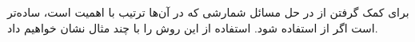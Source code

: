 \p
برای کمک گرفتن از 
 در حل مسائل شمارشی که در آن‌ها ترتیب با اهمیت است،
ساده‌تر است اگر از  استفاده شود.
استفاده از این روش را با چند مثال نشان خواهیم داد.



